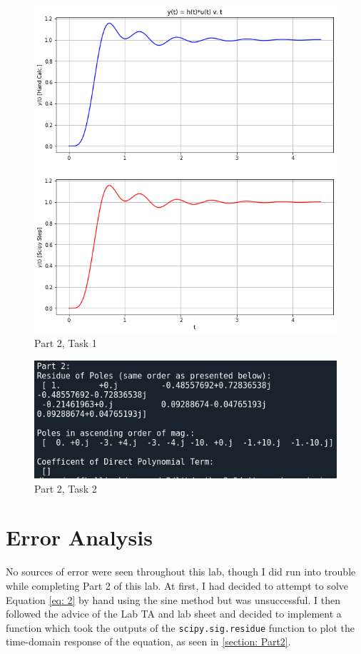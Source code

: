 \documentclass[12pt]{report}
\begin{document}
\begin{figure}[h!]
  \centering
  \includegraphics[scale=0.5]{p2t1.png}
  \caption{Part 2, Task 1}
  \label{fig: p2t1}
\end{figure}
\begin{figure}[h!]
  \centering
  \includegraphics[scale=0.5]{p2t2.png}
  \caption{Part 2, Task 2}
  \label{fig: p2t2}
\end{figure}
\section{Error Analysis}\label{section: ErAn}
No sources of error were seen throughout this lab, though I did run into trouble while completing Part 2 of this lab. At first, I had decided to attempt to solve
Equation \eqref{eq: 2} by hand using the sine method but was unsuccessful. I then followed the advice of the Lab TA and lab sheet and decided to implement a function
which took the outputs of the \texttt{scipy.sig.residue} function to plot the time-domain response of the equation, as seen in \ref{section: Part2}.
\end{document}
